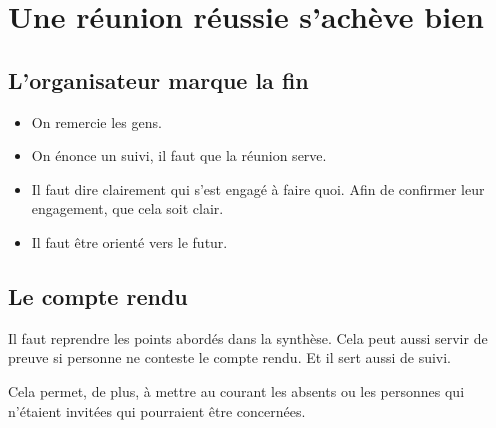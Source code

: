 \section{Une réunion réussie s'achève bien}
\subsection{L'organisateur marque la fin}
\begin{itemize}
    \item On remercie les gens.
    \item On énonce un suivi, il faut que la réunion serve.
    \item Il faut dire clairement qui s'est engagé à faire quoi. Afin de confirmer leur engagement, que cela soit clair.
    \item Il faut être orienté vers le futur.
\end{itemize}

\subsection{Le compte rendu}
Il faut reprendre les points abordés dans la synthèse. Cela peut aussi servir de preuve si personne ne conteste le compte rendu. Et il sert aussi de suivi.

Cela permet, de plus, à mettre au courant les absents ou les personnes qui n'étaient invitées qui pourraient être concernées.
